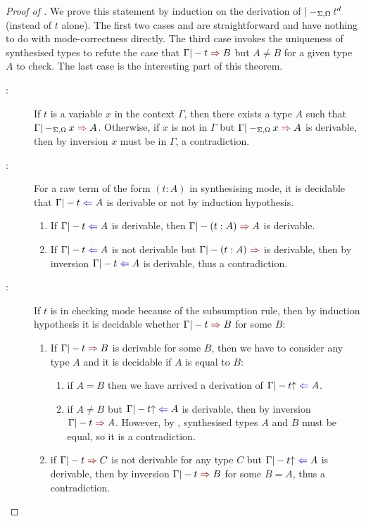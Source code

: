 \begin{proof}[Proof of {}]
  We prove this statement by induction on the derivation of $|-_{\Sigma, \Omega} \isTerm{t}^{d}$ (instead of $t$ alone).
  The first two cases  and  are straightforward and have nothing to do with mode-correctness directly.
  The third case  invokes the uniqueness of synthesised types to refute the case that $\Gamma |- t \syn B$ but $A \neq B$ for a given type $A$ to check.
  The last case  is the interesting part of this theorem.
  \begin{description}
    \item[:] If $t$ is a variable $x$ in the context $\Gamma$, then there exists a type $A$ such that $\Gamma |-_{\Sigma, \Omega} x \syn A$.
      Otherwise, if $x$ is not in $\Gamma$ but $\Gamma |-_{\Sigma, \Omega} x \syn A$ is derivable, then by inversion $x$ must be in $\Gamma$, a contradiction.
    \item[:] For a raw term of the form $(t : A)$ in synthesising mode, it is decidable that $\Gamma |- t \chk A$ is derivable or not by induction hypothesis.
      \begin{enumerate}
        \item If $\Gamma |- t \chk A$ is derivable, then $\Gamma |- (t : A) \syn A$ is derivable.
        \item If $\Gamma |- t \chk A$ is not derivable but $\Gamma |- (t : A) \syn$ is derivable, then by inversion $\Gamma |- t \chk A$ is derivable, thus a contradiction.
      \end{enumerate}
      
    \item[:] If $t$ is in checking mode because of the subsumption rule, then by induction hypothesis it is decidable whether $\Gamma |- t \syn B$ for some $B$:
      \begin{enumerate}
        \item If $\Gamma |- t \syn B$ is derivable for some $B$, then we have to consider any type $A$ and it is decidable if $A$ is equal to $B$:
          \begin{enumerate}
            \item if $A = B$ then we have arrived a derivation of $\Gamma |- t\subsum \chk A$.
            \item if $A \neq B$ but $\Gamma |- t \subsum \chk A$ is derivable, then by inversion $\Gamma |- t \syn A$.
              However, by , synthesised types $A$ and $B$ must be equal, so it is a contradiction.
          \end{enumerate}
        \item if $\Gamma |- t \syn C$ is not derivable for any type $C$ but $\Gamma |- t\subsum \chk A$ is derivable, then by inversion $\Gamma |- t \syn B$ for some $B = A$, thus a contradiction.
      \end{enumerate}
      

\end{description}
\end{proof}
